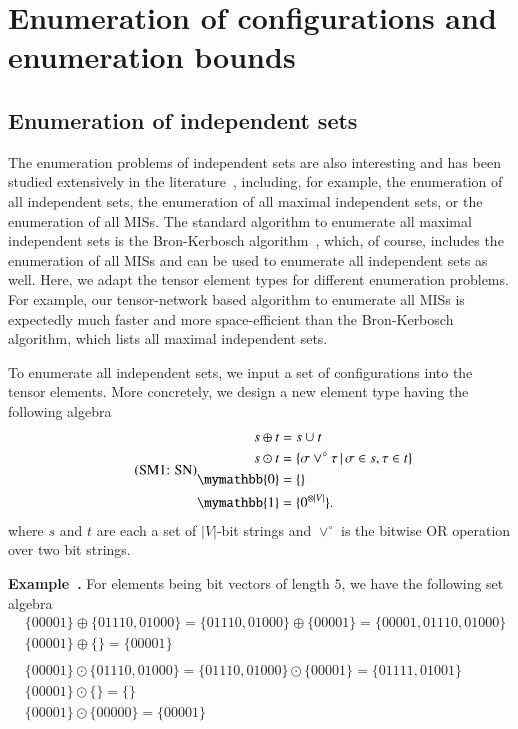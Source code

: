 \documentclass[onefignum, onetabnum]{siamart190516}
\newcommand{\eqname}[1]{\stepcounter{equation}\tag{\theequation : #1}}
\newcommand{\<}{\langle}
\renewcommand{\>}{\rangle}
\newcounter{example}
\newenvironment{example}[1][]{\refstepcounter{example}\par\medskip
   \noindent \textbf{Example~\theexample. #1} \rmfamily}{\medskip}
\begin{document}
\section{Enumeration of configurations and enumeration bounds}
\subsection{Enumeration of independent sets}
The enumeration problems of independent sets are also interesting and has been studied extensively in the literature~\cite{Bron1973, Eppstein2010, Johnson1988}, including,
for example, the enumeration of all independent sets, the enumeration of all maximal independent sets, or the enumeration of all MISs.
The standard algorithm to enumerate all maximal independent sets is the Bron-Kerbosch algorithm~\cite{Bron1973}, which, of course, includes the enumeration of all MISs and can be used to enumerate all independent sets as well.
Here, we adapt the tensor element types for different enumeration problems.
For example, our tensor-network based algorithm to enumerate all MISs is expectedly much faster and more space-efficient than the Bron-Kerbosch algorithm, which lists all maximal independent sets. 

To enumerate all independent sets, we input a set of configurations into the tensor elements. More concretely, we design a new element type having the following algebra
\begin{equation}
\eqname{SN}
\begin{split}
    s \oplus t &= s \cup t\\
    s \odot t &= \{\sigma \lor^\circ \tau \, | \, \sigma \in s, \tau \in t\}\\
    \mymathbb{0} &= \{\}\\
    \mymathbb{1} &= \{0^{\otimes |V|}\}.
\end{split}\label{eq:set}
\end{equation}
where $s$ and $t$ are each a set of $|V|$-bit strings and $\lor^\circ$ is the bitwise OR operation over two bit strings.
\begin{example}\label{eg:setalgebra}
    For elements being bit vectors of length $5$, we have the following set algebra
\begin{equation*}
\begin{split}
    &\{00001\} \oplus \{01110, 01000\} = \{01110, 01000\} \oplus \{00001\} = \{00001,01110, 01000\}\\
    &\{00001\} \oplus \{\} = \{00001\}\\
&\\
    &\{00001\} \odot \{01110, 01000\} = \{01110, 01000\} \odot \{00001\} = \{01111, 01001\}\\
    &\{00001\} \odot \{\} = \{\}\\
    &\{00001\} \odot \{00000\} = \{00001\}
\end{split}
\end{equation*}
\end{example}
\end{document}
